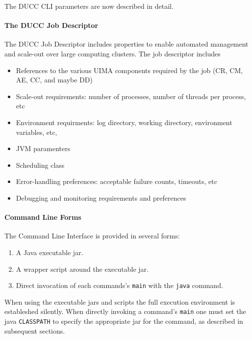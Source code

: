     The DUCC CLI parameters are now described in detail.

    \paragraph{The DUCC Job Descriptor}
    The DUCC Job Descriptor includes properties to enable automated management and scale-out 
    over large computing clusters.  The job descriptor includes
    \begin{itemize}
      \item References to the various UIMA components required by the job (CR, CM, AE, CC, and maybe DD)
      \item Scale-out requirements: number of processes, number of threads per process, etc
      \item Environment requirments: log directory, working directory, environment variables, etc,
      \item JVM paramenters
      \item Scheduling class
      \item Error-handling preferences: acceptable failure counts, timeouts, etc
      \item Debugging and monitoring requirements and preferences
    \end{itemize}
  

    \paragraph{Command  Line Forms}
    The Command Line Interface is provided in several forms:

    \begin{enumerate}
      \item A Java executable jar.
      \item A wrapper script around the executable jar.
      \item Direct invocation of each commands's {\tt main} with the {\tt java} command.
    \end{enumerate}

    When using the executable jars and scripts the full execution environment is estableshed
    silently.  When directly invoking a command's {\tt main} one must set the java {\tt CLASSPATH} to
    specify the appropriate jar for the command, as described in subsequent sections.

